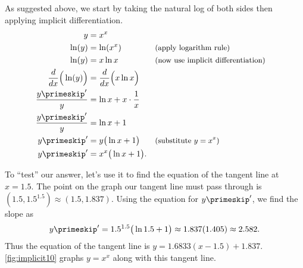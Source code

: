 {As suggested above, we start by taking the natural log of both sides then applying implicit differentiation.
\begin{align*}
y &= x^x \\
\ln (y) &= \ln (x^x) && \text{\small (apply logarithm rule)}\\
\ln (y) &= x\ln x && \text{\small (now use implicit differentiation)}\\
\frac{d}{dx}\Big(\ln (y)\Big) &= \frac{d}{dx}\Big(x\ln x\Big) \\
\frac{y\primeskip'}{y} &= \ln x + x\cdot\frac1x\\
\frac{y\primeskip'}{y} &= \ln x + 1\\
y\primeskip'
&= y\big(\ln x+1\big) && \text{\small (substitute $y=x^x$)}\\
y\primeskip' &= x^x\big(\ln x+1\big).
\end{align*} 


To ``test'' our answer, let's use it to find the equation of the tangent line at $x=1.5$. The point on the graph our tangent line must pass through is $(1.5, 1.5^{1.5}) \approx (1.5, 1.837)$. Using the equation for $y\primeskip'$, we find the slope as
\[y\primeskip' = 1.5^{1.5}\big(\ln 1.5+1\big) \approx 1.837(1.405) \approx 2.582.\]
Thus the equation of the tangent line is $y = 1.6833(x-1.5)+1.837$. \autoref{fig:implicit10} graphs $y=x^x$ along with this tangent line.}


